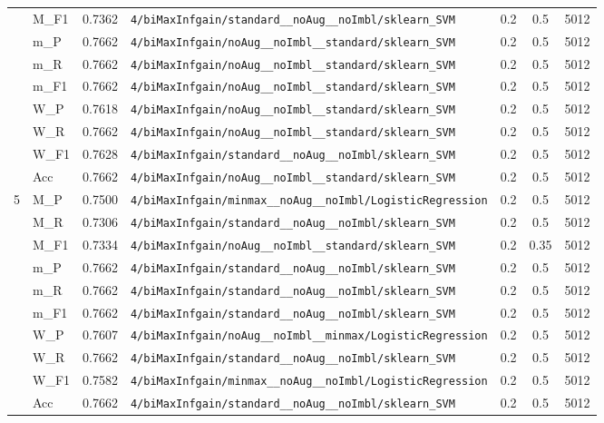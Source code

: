 \begin{table}[htbp]
\begin{tabular}{|c|l|c|>{\ttfamily\footnotesize}p{7.2cm}|c|c|c|}
 & M\_F1 & 0.7362 & \texttt{4/biMaxInfgain/standard\_\_noAug\_\_noImbl/sklearn\_SVM} & 0.2 & 0.5  & 5012 \\ 
 & m\_P & 0.7662 & \texttt{4/biMaxInfgain/noAug\_\_noImbl\_\_standard/sklearn\_SVM} & 0.2 & 0.5  & 5012 \\ 
 & m\_R & 0.7662 & \texttt{4/biMaxInfgain/noAug\_\_noImbl\_\_standard/sklearn\_SVM} & 0.2 & 0.5  & 5012 \\ 
 & m\_F1 & 0.7662 & \texttt{4/biMaxInfgain/noAug\_\_noImbl\_\_standard/sklearn\_SVM} & 0.2 & 0.5  & 5012 \\ 
 & W\_P & 0.7618 & \texttt{4/biMaxInfgain/noAug\_\_noImbl\_\_standard/sklearn\_SVM} & 0.2 & 0.5  & 5012 \\ 
 & W\_R & 0.7662 & \texttt{4/biMaxInfgain/noAug\_\_noImbl\_\_standard/sklearn\_SVM} & 0.2 & 0.5  & 5012 \\ 
 & W\_F1 & 0.7628 & \texttt{4/biMaxInfgain/standard\_\_noAug\_\_noImbl/sklearn\_SVM} & 0.2 & 0.5  & 5012 \\ 
 & Acc & 0.7662 & \texttt{4/biMaxInfgain/noAug\_\_noImbl\_\_standard/sklearn\_SVM} & 0.2 & 0.5  & 5012 \\ 
\hline
\multirow{10}{*}{5} & M\_P & 0.7500 & \texttt{4/biMaxInfgain/minmax\_\_noAug\_\_noImbl/LogisticRegression} & 0.2 & 0.5  & 5012 \\ 
 & M\_R & 0.7306 & \texttt{4/biMaxInfgain/standard\_\_noAug\_\_noImbl/sklearn\_SVM} & 0.2 & 0.5  & 5012 \\ 
 & M\_F1 & 0.7334 & \texttt{4/biMaxInfgain/noAug\_\_noImbl\_\_standard/sklearn\_SVM} & 0.2 & 0.35  & 5012 \\ 
 & m\_P & 0.7662 & \texttt{4/biMaxInfgain/standard\_\_noAug\_\_noImbl/sklearn\_SVM} & 0.2 & 0.5  & 5012 \\ 
 & m\_R & 0.7662 & \texttt{4/biMaxInfgain/standard\_\_noAug\_\_noImbl/sklearn\_SVM} & 0.2 & 0.5  & 5012 \\ 
 & m\_F1 & 0.7662 & \texttt{4/biMaxInfgain/standard\_\_noAug\_\_noImbl/sklearn\_SVM} & 0.2 & 0.5  & 5012 \\ 
 & W\_P & 0.7607 & \texttt{4/biMaxInfgain/noAug\_\_noImbl\_\_minmax/LogisticRegression} & 0.2 & 0.5  & 5012 \\ 
 & W\_R & 0.7662 & \texttt{4/biMaxInfgain/standard\_\_noAug\_\_noImbl/sklearn\_SVM} & 0.2 & 0.5  & 5012 \\ 
 & W\_F1 & 0.7582 & \texttt{4/biMaxInfgain/minmax\_\_noAug\_\_noImbl/LogisticRegression} & 0.2 & 0.5  & 5012 \\ 
 & Acc & 0.7662 & \texttt{4/biMaxInfgain/standard\_\_noAug\_\_noImbl/sklearn\_SVM} & 0.2 & 0.5  & 5012 \\ 
\hline
\end{tabular}
\end{table}